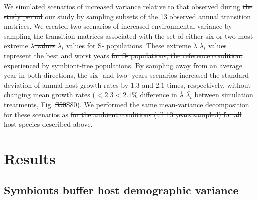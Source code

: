 \documentclass[lineno, sn-basic]{sn-jnl}%
\providecommand{\DIFadd}[1]{{\protect\color{blue}#1}} %
\providecommand{\DIFdel}[1]{{\protect\color{red}\protect\scriptsize\sout{#1}}}
\providecommand{\DIFadd}[1]{{\protect\color{blue}\uwave{#1}}} %
\providecommand{\DIFdel}[1]{{\protect\color{red}\sout{#1}}}                      %
\providecommand{\DIFaddbegin}{} %
\providecommand{\DIFaddend}{} %
\providecommand{\DIFdelbegin}{} %
\providecommand{\DIFdelend}{} %
\newcommand{\DIFscaledelfig}{0.5}
\newlength{\DIFdelgraphicswidth} %
\newlength{\DIFdelgraphicsheight} %
\newcommand{\DIFaddincludegraphics}[2][]{{\color{blue}\fbox{\DIFOincludegraphics[#1]{#2}}}} %
\newcommand{\DIFdelincludegraphics}[2][]{%
\sbox{\DIFdelgraphicsbox}{\DIFOincludegraphics[#1]{#2}}%
\settoboxwidth{\DIFdelgraphicswidth}{\DIFdelgraphicsbox} %
\settoboxtotalheight{\DIFdelgraphicsheight}{\DIFdelgraphicsbox} %
\scalebox{\DIFscaledelfig}{%
\parbox[b]{\DIFdelgraphicswidth}{\usebox{\DIFdelgraphicsbox}\\[-\baselineskip] \rule{\DIFdelgraphicswidth}{0em}}\llap{\resizebox{\DIFdelgraphicswidth}{\DIFdelgraphicsheight}{%
\setlength{\unitlength}{\DIFdelgraphicswidth}%
\begin{picture}(1,1)%
\thicklines\linethickness{2pt} %
{\color[rgb]{1,0,0}\put(0,0){\framebox(1,1){}}}%
{\color[rgb]{1,0,0}\put(0,0){\line( 1,1){1}}}%
{\color[rgb]{1,0,0}\put(0,1){\line(1,-1){1}}}%
\end{picture}%
}\hspace*{3pt}}} %
} %
\DeclareRobustCommand{\DIFaddbegin}{\DIFOaddbegin \let\includegraphics\DIFaddincludegraphics} %
\DeclareRobustCommand{\DIFaddend}{\DIFOaddend \let\includegraphics\DIFOincludegraphics} %
\DeclareRobustCommand{\DIFdelbegin}{\DIFOdelbegin \let\includegraphics\DIFdelincludegraphics} %
\DeclareRobustCommand{\DIFdelend}{\DIFOaddend \let\includegraphics\DIFOincludegraphics} %
\begin{document}
We simulated scenarios of increased variance relative to that observed during \DIFdelbegin \DIFdel{the study period }\DIFdelend \DIFaddbegin \DIFadd{our study }\DIFaddend by sampling subsets of the 13 observed annual transition matrices. 
We created two scenarios of increased environmental variance by sampling the transition matrices associated with the set of either six or two most extreme \DIFdelbegin \DIFdel{$\lambda$ values }\DIFdelend \DIFaddbegin \DIFadd{$\lambda_{t}$ values for S- populations}\DIFaddend . 
These extreme \DIFdelbegin \DIFdel{$\lambda$ }\DIFdelend \DIFaddbegin \DIFadd{$\lambda_{t}$ }\DIFaddend values represent the best and worst years \DIFdelbegin \DIFdel{for S- populations, the reference condition. 
	}\DIFdelend \DIFaddbegin \DIFadd{experienced by symbiont-free populations. 
}\DIFaddend By sampling away from an average year in both directions, the six- and two- years scenarios increased \DIFdelbegin \DIFdel{the }\DIFdelend standard deviation of annual host growth rates by $1.3$ and $2.1$ times, respectively, without changing mean growth rates (\DIFdelbegin \DIFdel{$<2.3$}\DIFdelend \DIFaddbegin \DIFadd{$<2.1$}\DIFaddend \% difference in \DIFdelbegin \DIFdel{$\overline{\lambda}$ }\DIFdelend \DIFaddbegin \DIFadd{$\overline{\lambda_{t}}$ }\DIFaddend between simulation treatments, Fig. \DIFdelbegin \DIFdel{S50}\DIFdelend \DIFaddbegin \DIFadd{S80}\DIFaddend ).
We performed the same mean-variance decomposition for these scenarios as \DIFdelbegin \DIFdel{for the ambient conditions (all 13 years sampled) for all host species }\DIFdelend described above. 

\section*{Results}
\subsection*{Symbionts buffer host demographic variance}
\end{document}
